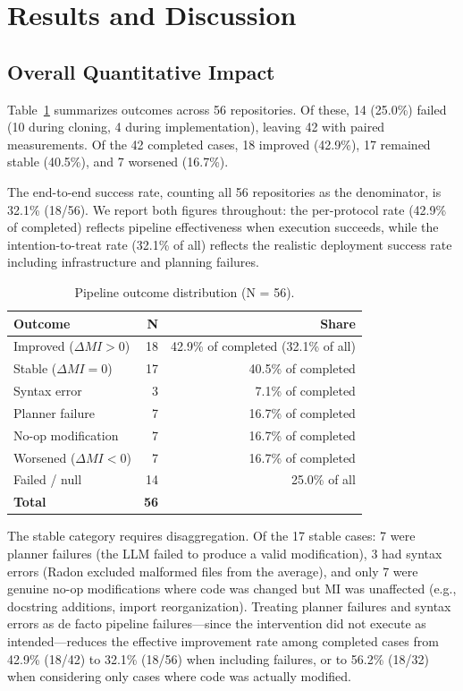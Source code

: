 \documentclass[sigconf,review,anonymous]{acmart}
\begin{document}
\section{Results and Discussion}

\subsection{Overall Quantitative Impact}

Table~\ref{tab:exp5_outcomes} summarizes outcomes across 56 repositories. Of these, 14 (25.0\%) failed (10 during cloning, 4 during implementation), leaving 42 with paired measurements. Of the 42 completed cases, 18 improved (42.9\%), 17 remained stable (40.5\%), and 7 worsened (16.7\%).

The end-to-end success rate, counting all 56 repositories as the denominator, is 32.1\% (18/56). We report both figures throughout: the per-protocol rate (42.9\% of completed) reflects pipeline effectiveness when execution succeeds, while the intention-to-treat rate (32.1\% of all) reflects the realistic deployment success rate including infrastructure and planning failures.

\begin{table}[H]
\centering
\small
\caption{Pipeline outcome distribution (N = 56).}
\label{tab:exp5_outcomes}
\begin{tabular}{lrr}
\toprule
\textbf{Outcome} & \textbf{N} & \textbf{Share} \\
\midrule
Improved ($\Delta MI > 0$)  & 18 & 42.9\% of completed (32.1\% of all) \\
Stable ($\Delta MI = 0$)    & 17 & 40.5\% of completed \\
\quad Syntax error          & 3  & 7.1\% of completed \\
\quad Planner failure       & 7  & 16.7\% of completed \\
\quad No-op modification    & 7  & 16.7\% of completed \\
Worsened ($\Delta MI < 0$)  & 7  & 16.7\% of completed \\
Failed / null               & 14 & 25.0\% of all \\
\midrule
\textbf{Total} & \textbf{56} & \\
\bottomrule
\end{tabular}
\end{table}

The stable category requires disaggregation. Of the 17 stable cases: 7 were planner failures (the LLM failed to produce a valid modification), 3 had syntax errors (Radon excluded malformed files from the average), and only 7 were genuine no-op modifications where code was changed but MI was unaffected (e.g., docstring additions, import reorganization). Treating planner failures and syntax errors as de facto pipeline failures---since the intervention did not execute as intended---reduces the effective improvement rate among completed cases from 42.9\% (18/42) to 32.1\% (18/56) when including failures, or to 56.2\% (18/32) when considering only cases where code was actually modified.
\end{document}
